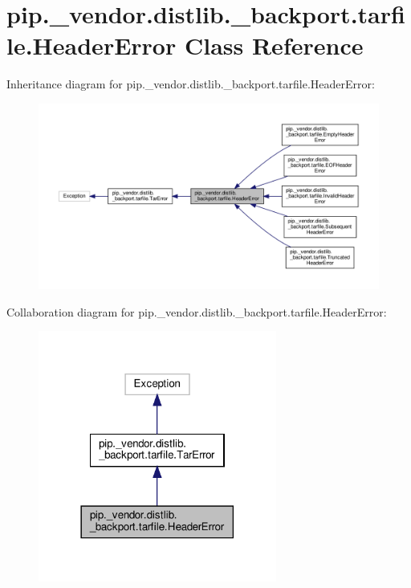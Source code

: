 \hypertarget{classpip_1_1__vendor_1_1distlib_1_1__backport_1_1tarfile_1_1HeaderError}{}\section{pip.\+\_\+vendor.\+distlib.\+\_\+backport.\+tarfile.\+Header\+Error Class Reference}
\label{classpip_1_1__vendor_1_1distlib_1_1__backport_1_1tarfile_1_1HeaderError}


Inheritance diagram for pip.\+\_\+vendor.\+distlib.\+\_\+backport.\+tarfile.\+Header\+Error\+:
\nopagebreak
\begin{figure}[H]
\begin{center}
\leavevmode
\includegraphics[width=350pt]{classpip_1_1__vendor_1_1distlib_1_1__backport_1_1tarfile_1_1HeaderError__inherit__graph}
\end{center}
\end{figure}


Collaboration diagram for pip.\+\_\+vendor.\+distlib.\+\_\+backport.\+tarfile.\+Header\+Error\+:
\nopagebreak
\begin{figure}[H]
\begin{center}
\leavevmode
\includegraphics[width=222pt]{classpip_1_1__vendor_1_1distlib_1_1__backport_1_1tarfile_1_1HeaderError__coll__graph}
\end{center}
\end{figure}


